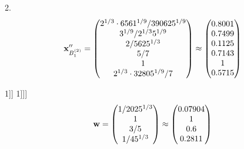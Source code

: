 \documentclass[10pt,a4paper]{article}
\begin{document}
	2.
	\[
		\bold{x}''_{B_1^{(2)}} = 
		\begin{pmatrix}
			{{2^ {1 / 3}} \cdot {6561^ {1 / 9}}} / {{390625^ {1 / 9}}} \\
			{{3^ {1 / 9}}} / {{2^ {1 / 3}}{5^ {1 / 9}}} \\
			{{2}} / {{5625^ {1 / 3}}} \\
			{{5}} / {{7}} \\
			{1}{} \\
			{{2^ {1 / 3}} \cdot {32805^ {1 / 9}}} / {{7}} \\
		\end{pmatrix}
		\approx
		\begin{pmatrix}
			0.8001   \\
			0.7499   \\
			0.1125   \\
			0.7143   \\
			1        \\
			0.5715   \\
		\end{pmatrix}
	\]

1]]
	1]]]
	\[
		\bold{w} = 
		\begin{pmatrix}
			{1} / {{2025^ {1 / 3}}} \\
			{1}{} \\
			{{3}} / {{5}} \\
			{1} / {{45^ {1 / 3}}} \\
		\end{pmatrix}
		\approx
		\begin{pmatrix}
			0.07904  \\
			1        \\
			0.6      \\
			0.2811   \\
		\end{pmatrix}
	\]
\end{document}
